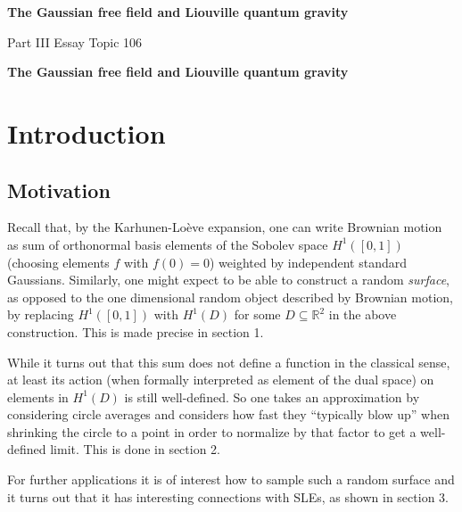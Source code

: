 \documentclass[11pt,reqno]{amsart}
\numberwithin{equation}{section}
\begin{document}
\begin{titlepage}
    \begin{center}
        \vspace*{1cm}
        
        \textbf{The Gaussian free field and Liouville quantum gravity}
        
        \vspace{0.5cm}
        Part III Essay Topic 106
        
        \vspace{1.5cm}
                	
    \end{center}
\end{titlepage}
\begin{center}\textbf{The Gaussian free field and Liouville quantum gravity}\end{center}
\tableofcontents

\section*{Introduction}
\subsection*{Motivation}

Recall that, by the Karhunen-Lo\`eve expansion, one can write Brownian motion as sum of orthonormal basis elements of the Sobolev space $H^1([0,1])$ (choosing elements $f$ with $f(0)=0$) weighted by independent standard Gaussians. Similarly, one might expect to be able to construct a random \emph{surface}, as opposed to the one dimensional random object described by Brownian motion, by replacing $H^1([0,1])$ with $H^1(D)$ for some $D\subseteq\mathbb R^2$ in the above construction. This is made precise in section 1.

While it turns out that this sum does not define a function in the classical sense, at least its action (when formally interpreted as element of the dual space) on elements in $H^1(D)$ is still well-defined. So one takes an approximation by considering circle averages and considers how fast they ``typically blow up'' when shrinking the circle to a point in order to normalize by that factor to get a well-defined limit. This is done in section 2.

For further applications it is of interest how to sample such a random surface and it turns out that it has interesting connections with SLEs, as shown in section 3.
\end{document}
